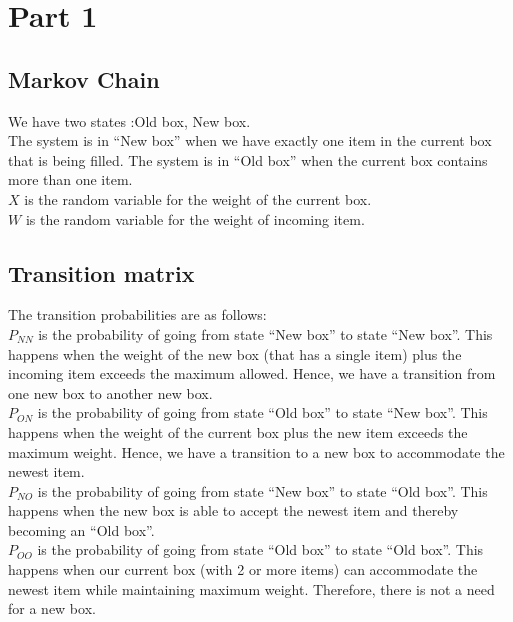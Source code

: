 \documentclass[10pt,a4paper]{article}
\begin{document}
\section{Part 1}
\subsection*{Markov Chain}
We have two states :{Old box, New box}. \\
The system is in ``New box'' when we have exactly one item in the current box that is being filled. The system is in ``Old box'' when the current box contains more than one item.\\
$ X $ is the random variable for the weight of the current box.\\
$ W $ is the random variable for the weight of incoming item.\\

\subsection*{Transition matrix}
The transition probabilities are as follows:\\
$ P_{NN} $ is the probability of going from state ``New box'' to state ``New box''. This happens when the weight of the new box (that has a single item) plus the incoming item exceeds the maximum allowed. Hence, we have a transition from one new box to another new box.\\
$ P_{ON} $ is the probability of going from state ``Old box'' to state ``New box''. This happens when the weight of the current box plus the new item exceeds the maximum weight. Hence, we have a transition to a new box to accommodate the newest item.\\
$ P_{NO} $ is the probability of going from state ``New box'' to state ``Old box''. This happens when the new box is able to accept the newest item and thereby becoming an ``Old box''.\\
$ P_{OO} $ is the probability of going from state ``Old box'' to state ``Old box''. This happens when our current box (with 2 or more items) can accommodate the newest item while maintaining maximum weight. Therefore, there is not a need for a new box. \\
\end{document}
